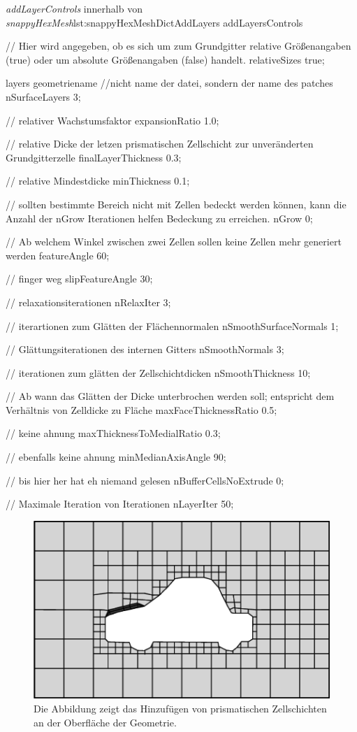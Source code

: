 \begin{dict}{\textit{addLayerControls} innerhalb von \textit{snappyHexMesh}}{lst:snappyHexMeshDictAddLayers}
addLayersControls
{
    // Hier wird angegeben, ob es sich um zum Grundgitter relative Größenangaben (true) oder um absolute Größenangaben (false) handelt. 
    relativeSizes true;

    layers
    {
        geometriename    //nicht name der datei, sondern der name des patches
        {
            nSurfaceLayers 3;
        }
    }

	// relativer Wachstumsfaktor
    expansionRatio 1.0;
	
	// relative Dicke der letzen prismatischen Zellschicht zur unveränderten Grundgitterzelle
    finalLayerThickness 0.3;

	// relative Mindestdicke
    minThickness 0.1;

	// sollten bestimmte Bereich nicht mit Zellen bedeckt werden können, kann die Anzahl der nGrow Iterationen helfen Bedeckung zu erreichen.
    nGrow 0;

	// Ab welchem Winkel zwischen zwei Zellen sollen keine Zellen mehr generiert werden
    featureAngle 60;

	// finger weg 
    slipFeatureAngle 30;

	// relaxationsiterationen
    nRelaxIter 3;

	// iterartionen zum Glätten der Flächennormalen 
    nSmoothSurfaceNormals 1;

    // Glättungsiterationen des internen Gitters
    nSmoothNormals 3;

   	// iterationen zum glätten der Zellschichtdicken
    nSmoothThickness 10;

    // Ab wann das Glätten der Dicke unterbrochen werden soll; entspricht dem Verhältnis von Zelldicke zu Fläche
    maxFaceThicknessRatio 0.5;

	// keine ahnung
    maxThicknessToMedialRatio 0.3;

	// ebenfalls keine ahnung
    minMedianAxisAngle 90;

    // bis hier her hat eh niemand gelesen
    nBufferCellsNoExtrude 0;

	// Maximale Iteration von Iterationen
    nLayerIter 50;
}
\end{dict}

\begin{figure}
\centering
\includegraphics[width=0.7\linewidth]{Abbildungen/snappy_addlayers}
\caption[Prismenschichten snappyHexMesh]{Die Abbildung zeigt das Hinzufügen von prismatischen Zellschichten an der Oberfläche der Geometrie.}
\label{fig:snappy_addlayers}
\end{figure}


